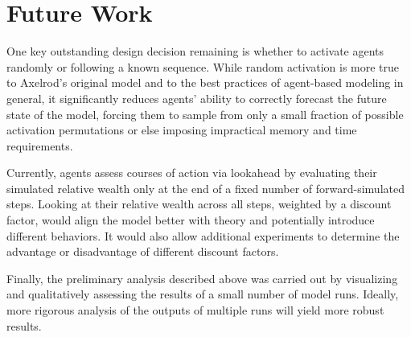 \documentclass{article}
\begin{document}
\section{Future Work}
One key outstanding design decision remaining is whether to activate agents randomly or following a known sequence. While random activation is more true to Axelrod's original model and to the best practices of agent-based modeling in general, it significantly reduces agents' ability to correctly forecast the future state of the model, forcing them to sample from only a small fraction of possible activation permutations or else imposing impractical memory and time requirements. 

Currently, agents assess courses of action via lookahead by evaluating their simulated relative wealth only at the end of a fixed number of forward-simulated steps. Looking at their relative wealth across all steps, weighted by a discount factor, would align the model better with theory and potentially introduce different behaviors. It would also allow additional experiments to determine the advantage or disadvantage of different discount factors.

Finally, the preliminary analysis described above was carried out by visualizing and qualitatively assessing the results of a small number of model runs. Ideally, more rigorous analysis of the outputs of multiple runs will yield more robust results.
\end{document}
